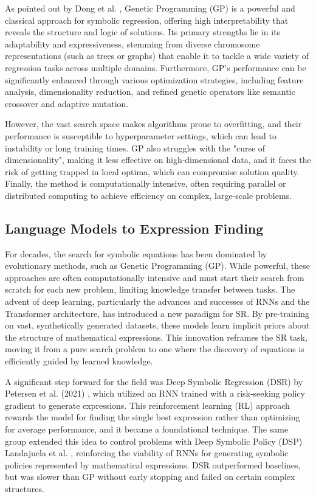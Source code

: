 As pointed out by Dong et al. \cite{dong2025RecentAdvances}, Genetic Programming (GP) is a powerful and classical approach for symbolic regression, offering high interpretability that reveals the structure and logic of solutions. Its primary strengths lie in its adaptability and expressiveness, stemming from diverse chromosome representations (such as trees or graphs) that enable it to tackle a wide variety of regression tasks across multiple domains. Furthermore, GP's performance can be significantly enhanced through various optimization strategies, including feature analysis, dimensionality reduction, and refined genetic operators like semantic crossover and adaptive mutation.

However, the vast search space makes algorithms prone to overfitting, and their performance is susceptible to hyperparameter settings, which can lead to instability or long training times. GP also struggles with the "curse of dimensionality", making it less effective on high-dimensional data, and it faces the risk of getting trapped in local optima, which can compromise solution quality. Finally, the method is computationally intensive, often requiring parallel or distributed computing to achieve efficiency on complex, large-scale problems.

\subsection{Language Models to Expression Finding}

For decades, the search for symbolic equations has been dominated by evolutionary methods, such as Genetic Programming (GP). While powerful, these approaches are often computationally intensive and must start their search from scratch for each new problem, limiting knowledge transfer between tasks. The advent of deep learning, particularly the advances and successes of RNNs and the Transformer architecture, has introduced a new paradigm for SR. By pre-training on vast, synthetically generated datasets, these models learn implicit priors about the structure of mathematical expressions. This innovation reframes the SR task, moving it from a pure search problem to one where the discovery of equations is efficiently guided by learned knowledge.

A significant step forward for the field was Deep Symbolic Regression (DSR) by Petersen et al. (2021) \cite{petersen2020deep}, which utilized an RNN trained with a risk-seeking policy gradient to generate expressions. This reinforcement learning (RL) approach rewards the model for finding the single best expression rather than optimizing for average performance, and it became a foundational technique. The same group extended this idea to control problems with Deep Symbolic Policy (DSP) Landajuela et al. \cite{landajuela_discovering_2021}, reinforcing the viability of RNNs for generating symbolic policies represented by mathematical expressions. DSR outperformed baselines, but was slower than GP without early stopping and failed on certain complex structures. 

